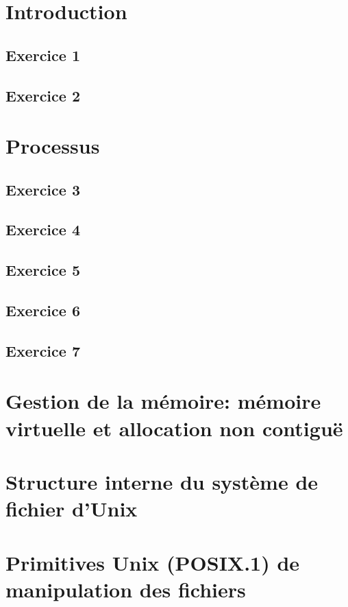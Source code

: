 \documentclass[12pt,a4paper,openany]{book}
\begin{document}
	\setcounter{tocdepth}{2}
	\setcounter{secnumdepth}{3}
	\maketitle
	\tableofcontents
	\chapter{Introduction}
		\section{Exercice 1}
		
		
		\section{Exercice 2}
		
		
	\chapter{Processus}
		\section{Exercice 3}
		
		\section{Exercice 4}
		\section{Exercice 5}
		\section{Exercice 6}
		\section{Exercice 7}
	\chapter{Gestion de la mémoire: mémoire virtuelle et allocation non contiguë}
	\chapter{Structure interne du système de fichier d'Unix}
	\chapter{Primitives Unix (POSIX.1) de manipulation des fichiers}
\end{document}
